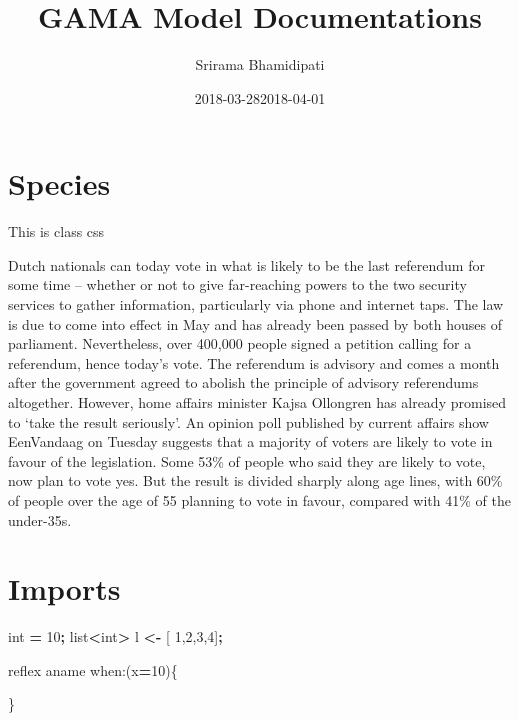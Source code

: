 \documentclass[]{book}
\title{GAMA Model Documentations}
\author{Srirama Bhamidipati}
\date{2018-03-28}
\date{2018-04-01}
\newenvironment{Shaded}{\begin{snugshade}}{\end{snugshade}}
\newcommand{\DecValTok}[1]{\textcolor[rgb]{0.00,0.00,0.81}{#1}}
\newcommand{\OperatorTok}[1]{\textcolor[rgb]{0.81,0.36,0.00}{\textbf{#1}}}
\newcommand{\BuiltInTok}[1]{#1}
\newcommand{\NormalTok}[1]{#1}
\begin{document}
\maketitle

{
\setcounter{tocdepth}{1}
\tableofcontents
}
\chapter{Species}\label{species}

 This is class css

Dutch nationals can today vote in what is likely to be the last
referendum for some time -- whether or not to give far-reaching powers
to the two security services to gather information, particularly via
phone and internet taps. The law is due to come into effect in May and
has already been passed by both houses of parliament. Nevertheless, over
400,000 people signed a petition calling for a referendum, hence today's
vote. The referendum is advisory and comes a month after the government
agreed to abolish the principle of advisory referendums altogether.
However, home affairs minister Kajsa Ollongren has already promised to
`take the result seriously'. An opinion poll published by current
affairs show EenVandaag on Tuesday suggests that a majority of voters
are likely to vote in favour of the legislation. Some 53\% of people who
said they are likely to vote, now plan to vote yes. But the result is
divided sharply along age lines, with 60\% of people over the age of 55
planning to vote in favour, compared with 41\% of the under-35s.

\chapter{Imports}\label{imports}

\begin{Shaded}
\begin{Highlighting}[]
\BuiltInTok{int} \OperatorTok{=} \DecValTok{10}\OperatorTok{;}
\BuiltInTok{list}\OperatorTok{<}\BuiltInTok{int}\OperatorTok{>}\NormalTok{ l }\OperatorTok{<-}\NormalTok{ [ }\DecValTok{1}\NormalTok{,}\DecValTok{2}\NormalTok{,}\DecValTok{3}\NormalTok{,}\DecValTok{4}\NormalTok{]}\OperatorTok{;}

\NormalTok{reflex aname when:(x}\OperatorTok{=}\DecValTok{10}\NormalTok{)\{}

\NormalTok{\}}
\end{Highlighting}
\end{Shaded}
\end{document}
